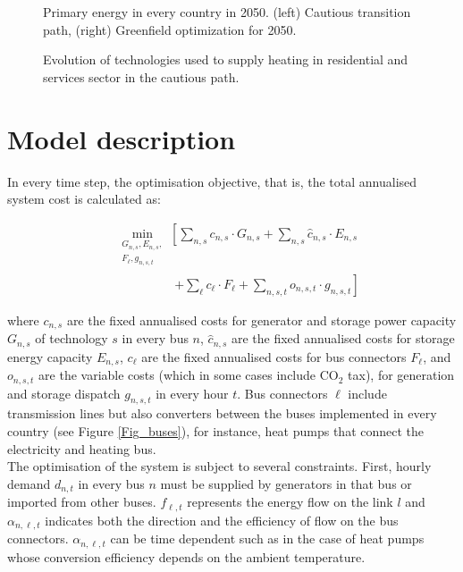 \documentclass[3p]{elsarticle} %
\begin{document}
\begin{figure}[!h]
\centering
\caption{Primary energy in every country in 2050. (left) Cautious transition path, (right) Greenfield optimization for 2050.} \label{fig_spatial_plot} 
\end{figure}

\begin{figure}[!h]
\centering
\caption{Evolution of technologies used to supply heating in residential and services sector in the cautious path. } \label{fig_heating_shares} 
\end{figure}

\FloatBarrier

\section{Model description}

In every time step, the optimisation objective, that is, the total annualised system cost is calculated as:

\begin{align}
& \min_{\substack{G_{n,s},E_{n,s},\\F_\ell,g_{n,s,t}}} \left[ \sum_{n,s} c_{n,s} \cdot G_{n,s} +\sum_{n,s} \hat{c}_{n,s} \cdot E_{n,s} \right. \nonumber \\
& \hspace{2cm} \left. + \sum_{\ell} c_{\ell} \cdot F_{\ell}+ \sum_{n,s,t} o_{n,s,t} \cdot g_{n,s,t} \right]
\label{eq_objective}
\end{align}

where $c_{n,s}$ are the fixed annualised costs for generator and storage power capacity $G_{n,s}$ of technology $s$ in every bus $n$, $\hat{c}_{n,s}$ are the fixed annualised costs for storage energy capacity $E_{n,s}$, $c_\ell$ are the fixed annualised costs for bus connectors $F_{\ell}$, and $o_{n,s,t}$ are the variable costs (which in some cases include CO$_2$ tax), for generation and storage dispatch $g_{n,s,t}$ in every hour $t$. Bus connectors $\ell$ include transmission lines but also converters between the buses implemented in every country (see Figure \ref{Fig_buses}), for instance, heat pumps that connect the electricity and heating bus. \\

The optimisation of the system is subject to several constraints. First, hourly demand $d_{n,t}$ in every bus $n$ must be supplied by generators in that bus or imported from other buses. $f_{\ell,t}$ represents the energy flow on the link $l$ and $\alpha_{n,\ell,t}$ indicates both the direction and the efficiency of flow on the bus connectors.  $\alpha_{n,\ell,t}$ can be time dependent such as in the case of heat pumps whose conversion efficiency depends on the ambient temperature.
\end{document}
